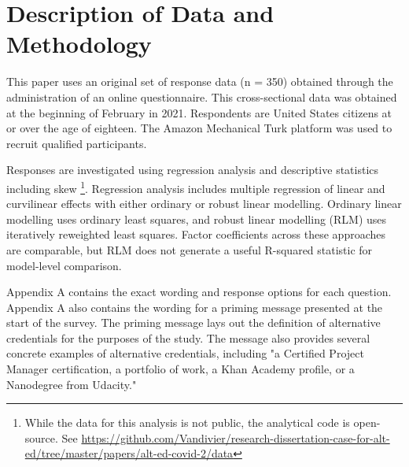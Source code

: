 \documentclass[review]{elsarticle}
\begin{document}

\section{Description of Data and Methodology}

This paper uses an original set of response data (n = 350) obtained through the administration of an online questionnaire.
This cross-sectional data was obtained at the beginning of February in 2021.
Respondents are United States citizens at or over the age of eighteen.
The Amazon Mechanical Turk platform was used to recruit qualified participants.

Responses are investigated using regression analysis and descriptive statistics including skew
\footnote{
    While the data for this analysis is not public, the analytical code is open-source.
    See \url{https://github.com/Vandivier/research-dissertation-case-for-alt-ed/tree/master/papers/alt-ed-covid-2/data}
}.
Regression analysis includes multiple regression of linear and curvilinear effects
with either ordinary or robust linear modelling.
Ordinary linear modelling uses ordinary least squares,
and robust linear modelling (RLM) uses iteratively reweighted least squares.
Factor coefficients across these approaches are comparable,
but RLM does not generate a useful R-squared statistic
for model-level comparison.

Appendix A contains the exact wording and response options for each question.
Appendix A also contains the wording for a priming message presented at the start of the survey.
The priming message lays out the definition of alternative credentials for the purposes of the study.
The message also provides several concrete examples of alternative credentials,
including "a Certified Project Manager certification,
a portfolio of work, a Khan Academy profile, or a Nanodegree from Udacity."
\end{document}
